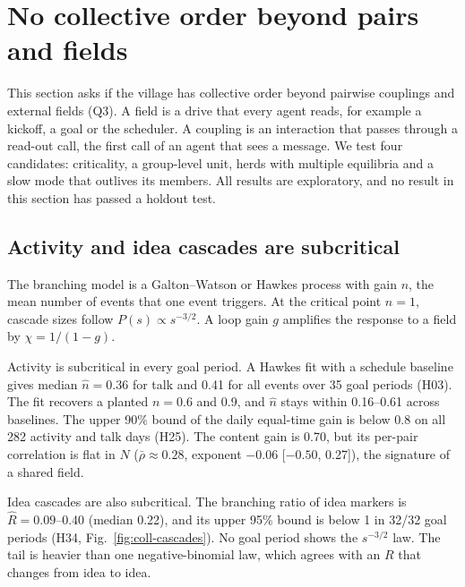 \section{No collective order beyond pairs and fields}
\label{sec:collective}

This section asks if the village has collective order beyond pairwise couplings and external fields (Q3).
A field is a drive that every agent reads, for example a kickoff, a goal or the scheduler.
A coupling is an interaction that passes through a read-out call, the first call of an agent that sees a message.
We test four candidates: criticality, a group-level unit, herds with multiple equilibria and a slow mode that outlives its members.
All results are exploratory, and no result in this section has passed a holdout test.

\subsection{Activity and idea cascades are subcritical}
\label{sec:coll-subcritical}

The branching model is a Galton--Watson or Hawkes process with gain $n$, the mean number of events that one event triggers.
At the critical point $n=1$, cascade sizes follow $P(s)\propto s^{-3/2}$.
A loop gain $g$ amplifies the response to a field by $\chi=1/(1-g)$.

Activity is subcritical in every goal period.
A Hawkes fit with a schedule baseline gives median $\hat n=0.36$ for talk and 0.41 for all events over 35 goal periods (H03).
The fit recovers a planted $n=0.6$ and 0.9, and $\hat n$ stays within 0.16--0.61 across baselines.
The upper 90\% bound of the daily equal-time gain is below 0.8 on all 282 activity and talk days (H25).
The content gain is 0.70, but its per-pair correlation is flat in $N$ ($\bar\rho\approx0.28$, exponent $-0.06$ [$-0.50$, 0.27]), the signature of a shared field.

Idea cascades are also subcritical.
The branching ratio of idea markers is $\hat R=0.09$--0.40 (median 0.22), and its upper 95\% bound is below 1 in 32/32 goal periods (H34, Fig.~\ref{fig:coll-cascades}).
No goal period shows the $s^{-3/2}$ law.
The tail is heavier than one negative-binomial law, which agrees with an $R$ that changes from idea to idea.

